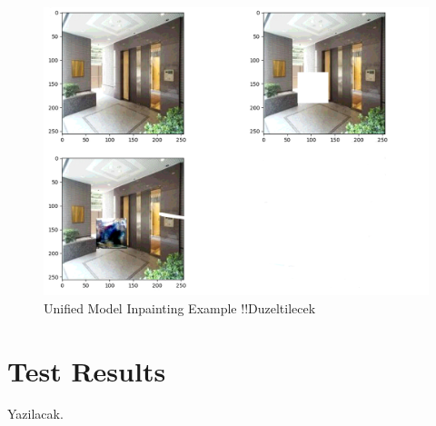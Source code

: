 \begin{figure}[h]
    \centering
    \includegraphics[scale=0.5]{figures/chapter5/testUnified.PNG}
    \caption{Unified Model Inpainting Example !!Duzeltilecek}
    \label{fig:unifiedexample}
\end{figure}

\newpage
\section{Test Results}

Yazilacak.